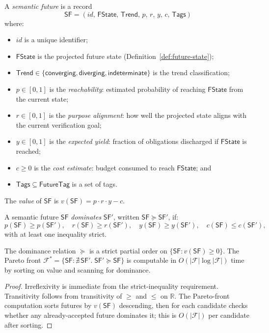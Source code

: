 \documentclass[11pt]{article}
\newcommand{\SF}{\mathsf{SF}}               %
\newcommand{\FState}{\mathsf{FState}}       %
\newcommand{\Trend}{\mathsf{Trend}}         %
\newcommand{\Tags}{\mathsf{Tags}}           %
\begin{document}
\begin{definition}[SemanticFuture]\label{def:semantic-future}
A \emph{semantic future} is a record
\[
  \SF = (\mathit{id},\, \FState,\, \Trend,\, p,\, r,\, y,\, c,\, \Tags)
\]
where:
\begin{itemize}
  \item $\mathit{id}$ is a unique identifier;
  \item $\FState$ is the projected future state (Definition~\ref{def:future-state});
  \item $\Trend \in \{\mathsf{converging}, \mathsf{diverging},
        \mathsf{indeterminate}\}$ is the trend classification;
  \item $p \in [0,1]$ is the \emph{reachability}: estimated probability
        of reaching $\FState$ from the current state;
  \item $r \in [0,1]$ is the \emph{purpose alignment}: how well the
        projected state aligns with the current verification goal;
  \item $y \in [0,1]$ is the \emph{expected yield}: fraction of
        obligations discharged if $\FState$ is reached;
  \item $c \ge 0$ is the \emph{cost estimate}: budget consumed to reach
        $\FState$; and
  \item $\Tags \subseteq \mathsf{FutureTag}$ is a set of tags.
\end{itemize}
The \emph{value} of $\SF$ is $v(\SF) = p \cdot r \cdot y - c$.
\end{definition}

\begin{definition}[Dominance]\label{def:dominance}
A semantic future $\SF$ \emph{dominates} $\SF'$, written
$\SF \succcurlyeq \SF'$, if:
\[
  p(\SF) \ge p(\SF'),\quad
  r(\SF) \ge r(\SF'),\quad
  y(\SF) \ge y(\SF'),\quad
  c(\SF) \le c(\SF'),
\]
with at least one inequality strict.
\end{definition}

\begin{proposition}\label{prop:pareto}
The dominance relation $\succcurlyeq$ is a strict partial order on
$\{\SF : v(\SF) \ge 0\}$.  The Pareto front
$\mathcal{F}^* = \{\SF : \nexists\, \SF'.\; \SF' \succcurlyeq \SF\}$
is computable in $O(|\mathcal{F}|\log|\mathcal{F}|)$ time by sorting on
value and scanning for dominance.
\end{proposition}

\begin{proof}
Irreflexivity is immediate from the strict-inequality requirement.
Transitivity follows from transitivity of $\ge$ and $\le$ on $\mathbb{R}$.
The Pareto-front computation sorts futures by $v(\SF)$ descending, then
for each candidate checks whether any already-accepted future dominates
it; this is $O(|\mathcal{F}|)$ per candidate after sorting.
\end{proof}
\end{document}
